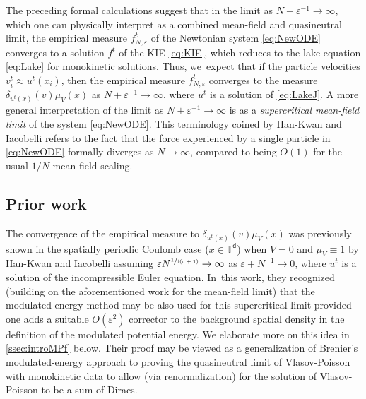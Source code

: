 \documentclass[10pt]{amsart}
\theoremstyle{plain}
\theoremstyle{definition}
\newcommand{\T}{{\mathbb{T}}}
\let\vep\varepsilon
\renewcommand{\d}{\mathsf{d}}
\begin{document}
The preceding formal calculations suggest that in the limit as $N +\vep^{-1}\to\infty$, which one can physically interpret as a combined mean-field and quasineutral limit, the empirical measure $f_{N,\vep}^t$ of the Newtonian system \eqref{eq:NewODE} converges to a solution $f^t$ of the KIE \eqref{eq:KIE}, which reduces to the lake equation \eqref{eq:Lake} for monokinetic solutions. Thus, we~expect that if the particle velocities $v_i^t \approx u^t(x_i)$, then the empirical measure $f_{N,\vep}^t$ converges to the measure $\delta_{u^t(x)}(v)\mu_V(x)$ as $N+\vep^{-1}\to\infty$, where $u^t$ is a solution of \eqref{eq:LakeJ}. A more general interpretation of the limit as $N +\vep^{-1}\to\infty$ is as a \emph{supercritical mean-field limit} of the system \eqref{eq:NewODE}. This terminology coined by Han-Kwan and Iacobelli \cite{HkI2021} refers to the fact that the force experienced by a single particle in \eqref{eq:NewODE} formally diverges as $N\to\infty$, compared to being $O(1)$ for the usual $1/N$ mean-field scaling.

\subsection{Prior work}\label{ssec:introPW}

The convergence of the empirical measure to $\delta_{u^t(x)}(v)\mu_V(x)$ was previously shown in the spatially periodic Coulomb case (\ie $x\in\T^\d$) when $V=0$ and $\mu_V\equiv 1$ by Han-Kwan and Iacobelli \cite{HkI2021} assuming $\vep N^{\sfrac{1}{\d(\d+1)}} \to \infty$ as $\vep+N^{-1}\to 0$, where $u^t$ is a solution of the incompressible Euler equation. In~this work, they recognized (building on the aforementioned work \cite[App.]{Serfaty2020} for the mean-field limit) that the modulated-energy method may be also used for this supercritical limit provided one adds a suitable $O(\vep^2)$ corrector to the background spatial density in the definition of the modulated potential energy. We elaborate more on this idea in \cref{ssec:introMPf} below. Their proof may be viewed as a generalization of Brenier's \cite{Brenier2000} modulated-energy approach to proving the quasineutral limit of Vlasov-Poisson with monokinetic data to allow (via renormalization) for the solution of Vlasov-Poisson to be a sum of Diracs.
\end{document}
